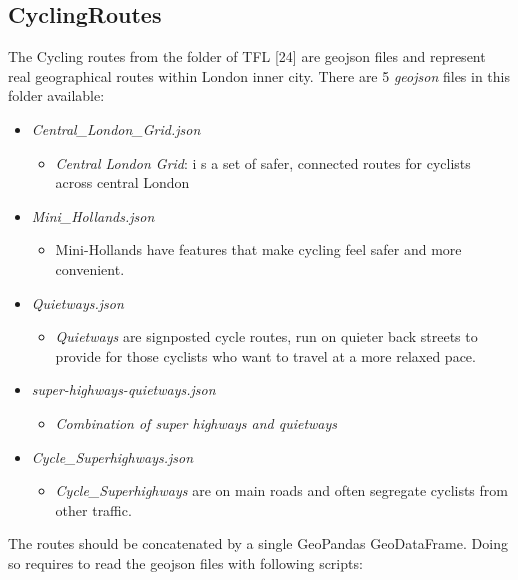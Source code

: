 \documentclass[12pt]{article}
\begin{document}
\subsection{CyclingRoutes}
The Cycling routes from the folder of TFL [24] are geojson files and represent real geographical
routes within London inner city.
There are 5 \emph{geojson} files in this folder available:
\begin{itemize}
\item \emph{Central\_London\_Grid.json}
\begin{itemize}
\item \emph{Central London Grid}: i s a set of safer, connected routes for cyclists across central London
\end{itemize}
\item \emph{Mini\_Hollands.json}
\begin{itemize}
\item Mini-Hollands have features that make cycling feel safer and more convenient.
\end{itemize}
\item \emph{Quietways.json}
\begin{itemize}
\item \emph{Quietways} are signposted cycle routes, run on quieter back streets to provide for those cyclists who want to travel at a more relaxed pace.
\end{itemize}
\item \emph{super-highways-quietways.json}
\begin{itemize}
\item \emph{Combination of super highways and quietways}
\end{itemize}
\item \emph{Cycle\_Superhighways.json}
\begin{itemize}
\item \emph{Cycle\_Superhighways} are on main roads and often segregate cyclists from other
traffic.
\end{itemize}
\end{itemize}
The routes should be concatenated by a single GeoPandas GeoDataFrame. Doing so requires to read the
geojson files with following scripts:
\end{document}
